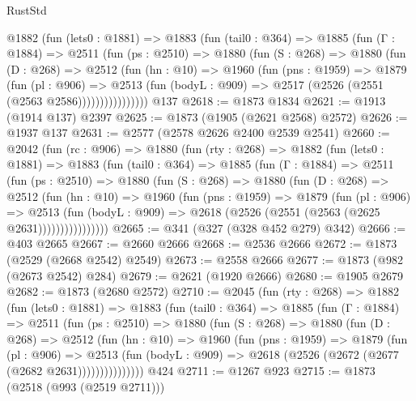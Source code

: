\begin{lexlean}{RustStd}
\begin{coremodule}
        @1882
          (fun (lets0 : @1881) =>
          @1883
            (fun (tail0 : @364) =>
            @1885
              (fun (Γ : @1884) =>
              @2511
                (fun (ps : @2510) =>
                @1880
                  (fun (S : @268) =>
                  @1880
                    (fun (D : @268) =>
                    @2512
                      (fun (hn : @10) =>
                      @1960
                        (fun (pns : @1959) =>
                        @1879
                          (fun (pl : @906) =>
                          @2513
                            (fun (bodyL : @909) => @2517 (@2526 (@2551 (@2563 @2586))))))))))))))))
    @137
@2618 := @1873 @1834
@2621 := @1913 (@1914 @137) @2397
@2625 := @1873 (@1905 (@2621 @2568) @2572)
@2626 := @1937 @137
@2631 := @2577 (@2578 @2626 @2400 @2539 @2541)
@2660 := @2042
    (fun (rc : @906) =>
    @1880
      (fun (rty : @268) =>
      @1882
        (fun (lets0 : @1881) =>
        @1883
          (fun (tail0 : @364) =>
          @1885
            (fun (Γ : @1884) =>
            @2511
              (fun (ps : @2510) =>
              @1880
                (fun (S : @268) =>
                @1880
                  (fun (D : @268) =>
                  @2512
                    (fun (hn : @10) =>
                    @1960
                      (fun (pns : @1959) =>
                      @1879
                        (fun (pl : @906) =>
                        @2513
                          (fun (bodyL : @909) =>
                          @2618 (@2526 (@2551 (@2563 (@2625 @2631))))))))))))))))
@2665 := @341 (@327 (@328 @452 @279) @342)
@2666 := @403 @2665
@2667 := @2660 @2666
@2668 := @2536 @2666
@2672 := @1873 (@2529 (@2668 @2542) @2549)
@2673 := @2558 @2666
@2677 := @1873 (@982 (@2673 @2542) @284)
@2679 := @2621 (@1920 @2666)
@2680 := @1905 @2679
@2682 := @1873 (@2680 @2572)
@2710 := @2045
    (fun (rty : @268) =>
    @1882
      (fun (lets0 : @1881) =>
      @1883
        (fun (tail0 : @364) =>
        @1885
          (fun (Γ : @1884) =>
          @2511
            (fun (ps : @2510) =>
            @1880
              (fun (S : @268) =>
              @1880
                (fun (D : @268) =>
                @2512
                  (fun (hn : @10) =>
                  @1960
                    (fun (pns : @1959) =>
                    @1879
                      (fun (pl : @906) =>
                      @2513
                        (fun (bodyL : @909) =>
                        @2618 (@2526 (@2672 (@2677 (@2682 @2631)))))))))))))))
    @424
@2711 := @1267 @923
@2715 := @1873 (@2518 (@993 (@2519 @2711)))

\end{coremodule}
\end{lexlean}

